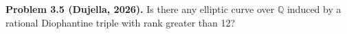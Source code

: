 \textbf{Problem 3.5 (Dujella, 2026).} Is there any elliptic curve over $\mathbb{Q}$ induced by a rational Diophantine triple with rank greater than 12?
